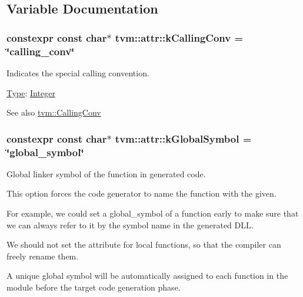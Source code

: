 \subsection{Variable Documentation}
\subsubsection[{\texorpdfstring{k\+Calling\+Conv}{kCallingConv}}]{\setlength{\rightskip}{0pt plus 5cm}constexpr const char$\ast$ tvm\+::attr\+::k\+Calling\+Conv = \char`\"{}calling\+\_\+conv\char`\"{}}\hypertarget{namespacetvm_1_1attr_a24f18111e9d98d9ce0229edc0a42e2be}{}\label{namespacetvm_1_1attr_a24f18111e9d98d9ce0229edc0a42e2be}


Indicates the special calling convention. 

\hyperlink{classtvm_1_1Type}{Type}\+: \hyperlink{classtvm_1_1Integer}{Integer}

\begin{DoxySeeAlso}{See also}
\hyperlink{namespacetvm_a85e4536ea4e1c8d3d48c61135f0a8ff0}{tvm\+::\+Calling\+Conv} 
\end{DoxySeeAlso}
\subsubsection[{\texorpdfstring{k\+Global\+Symbol}{kGlobalSymbol}}]{\setlength{\rightskip}{0pt plus 5cm}constexpr const char$\ast$ tvm\+::attr\+::k\+Global\+Symbol = \char`\"{}global\+\_\+symbol\char`\"{}}\hypertarget{namespacetvm_1_1attr_a7737d03caeeaeac61531ace9a91f7d74}{}\label{namespacetvm_1_1attr_a7737d03caeeaeac61531ace9a91f7d74}


Global linker symbol of the function in generated code. 

This option forces the code generator to name the function with the given.

For example, we could set a global\+\_\+symbol of a function early to make sure that we can always refer to it by the symbol name in the generated D\+LL.

We should not set the attribute for local functions, so that the compiler can freely rename them.

A unique global symbol will be automatically assigned to each function in the module before the target code generation phase.

